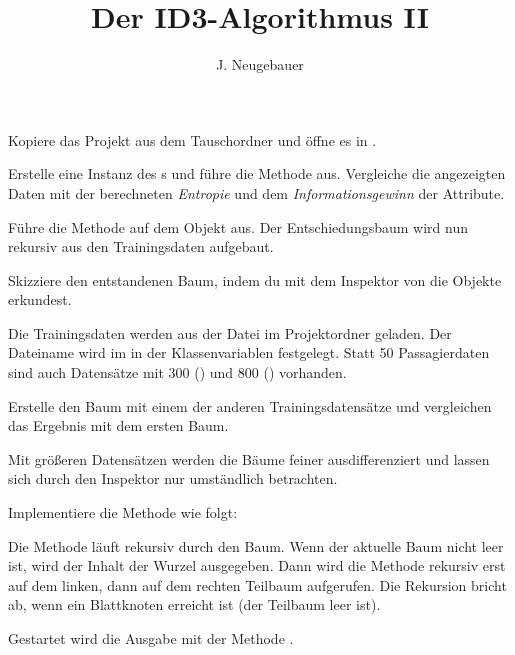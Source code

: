 \documentclass[10pt, a4paper]{scrartcl}
\author{J. Neugebauer}
\title{Der ID3-Algorithmus II}
\date{\Heute}
\begin{document}
\ReiheTitel

Kopiere das Projekt  aus dem Tauschordner
und öffne es in .

\begin{aufgabe}[symbol=\symLaptop]
	Erstelle eine Instanz des s und führe die Methode  aus. Vergleiche die angezeigten Daten mit der berechneten \emph{Entropie} und dem \emph{Informationsgewinn} der Attribute.
\end{aufgabe}

\begin{aufgabe}[symbol=\symLaptop\,\symHeft]
	Führe die Methode  auf dem Objekt aus. Der
	Entschiedungsbaum wird nun rekursiv aus den Trainingsdaten aufgebaut.
	
	Skizziere den entstandenen Baum, indem du mit dem Inspektor von 
	 die Objekte erkundest.
	
	\begin{rahmen}
		\vspace*{4cm}
	\end{rahmen}
	\medskip
\end{aufgabe}

\begin{aufgabe}[symbol=\symLaptop]
	Die Trainingsdaten werden aus der Datei  im Projektordner geladen. Der Dateiname wird im  in der Klassenvariablen  festgelegt. Statt 50 Passagierdaten sind auch Datensätze mit 300 () und 800 () vorhanden.
	
	Erstelle den Baum mit einem der anderen Trainingsdatensätze und vergleichen
	das Ergebnis mit dem ersten Baum.
	
\end{aufgabe}

\begin{aufgabe}[symbol=\symLaptop]
	Mit größeren Datensätzen werden die Bäume feiner ausdifferenziert und lassen sich durch den Inspektor nur umständlich betrachten.
	
	Implementiere die Methode  wie folgt:
	
	Die Methode läuft rekursiv durch den Baum. Wenn der aktuelle Baum nicht leer ist, wird der Inhalt der Wurzel ausgegeben. Dann wird die Methode rekursiv erst auf dem linken, dann auf dem rechten Teilbaum aufgerufen. Die Rekursion bricht ab, wenn ein Blattknoten erreicht ist (der Teilbaum leer ist).
	
	Gestartet wird die Ausgabe mit der Methode .
\end{aufgabe}
\end{document}

